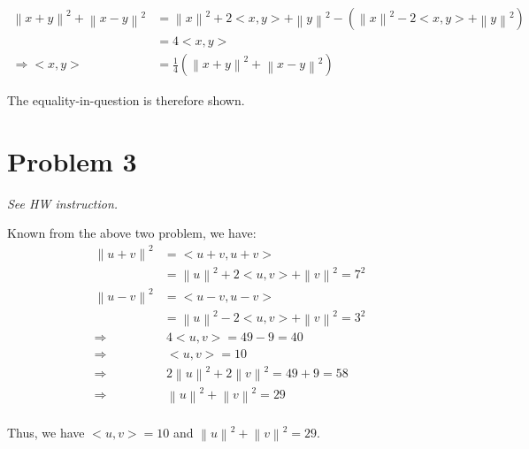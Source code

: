 \documentclass[11pt]{article}
\providecommand{\norm}[1]{\left\lVert #1 \right\rVert}
\begin{document}
\begin{align*}
    \norm{x + y}^2 + \norm{x - y}^2 &= \norm{x}^2 + 2<x, y> + \norm{y}^2  - (\norm{x}^2 - 2<x, y> + \norm{y}^2) \\
    &= 4<x, y> \\
    \Longrightarrow <x, y> &= \frac{1}{4}(\norm{x + y}^2 + \norm{x - y}^2)
\end{align*}

The equality-in-question is therefore shown.

\section*{Problem 3}
\textit{See HW instruction.}\newline

Known from the above two problem, we have:
\begin{align*}
    \norm{u + v}^2 &= <u + v, u + v> \\
    &= \norm{u}^2 + 2<u, v> + \norm{v}^2 = 7^2 \\
    \norm{u - v}^2 &= <u - v, u - v> \\
    &= \norm{u}^2 - 2<u, v> + \norm{v}^2 = 3^2 \\
    \Rightarrow& \ 4<u, v> = 49 - 9 = 40 \\
    \Longrightarrow& \ <u, v> = 10 \\
    \Rightarrow& \ 2\norm{u}^2 + 2\norm{v}^2 = 49 + 9 = 58 \\
    \Longrightarrow& \ \norm{u}^2 + \norm{v}^2 = 29 \\
\end{align*}

Thus, we have $<u, v> = 10$ and $\norm{u}^2 + \norm{v}^2 = 29$.
\end{document}
